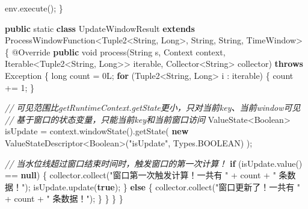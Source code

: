 \documentclass[cn,11pt,chinese]{elegantbook}
\newenvironment{Shaded}{}{}
\newcommand{\AttributeTok}[1]{\textcolor[rgb]{0.49,0.56,0.16}{#1}}
\newcommand{\BuiltInTok}[1]{#1}
\newcommand{\CommentTok}[1]{\textcolor[rgb]{0.38,0.63,0.69}{\textit{#1}}}
\newcommand{\DataTypeTok}[1]{\textcolor[rgb]{0.56,0.13,0.00}{#1}}
\newcommand{\DecValTok}[1]{\textcolor[rgb]{0.25,0.63,0.44}{#1}}
\newcommand{\FunctionTok}[1]{\textcolor[rgb]{0.02,0.16,0.49}{#1}}
\newcommand{\KeywordTok}[1]{\textcolor[rgb]{0.00,0.44,0.13}{\textbf{#1}}}
\newcommand{\NormalTok}[1]{#1}
\newcommand{\StringTok}[1]{\textcolor[rgb]{0.25,0.44,0.63}{#1}}
\begin{document}
\begin{Shaded}
\begin{Highlighting}[]
\NormalTok{        env.}\FunctionTok{execute}\NormalTok{();}
\NormalTok{    \}}

    \KeywordTok{public} \DataTypeTok{static} \KeywordTok{class}\NormalTok{ UpdateWindowResult }\KeywordTok{extends}\NormalTok{ ProcessWindowFunction\textless{}Tuple2\textless{}}\BuiltInTok{String}\NormalTok{, }\BuiltInTok{Long}\NormalTok{\textgreater{}, }\BuiltInTok{String}\NormalTok{, }\BuiltInTok{String}\NormalTok{, TimeWindow\textgreater{} \{}
        \AttributeTok{@Override}
        \KeywordTok{public} \DataTypeTok{void} \FunctionTok{process}\NormalTok{(}\BuiltInTok{String}\NormalTok{ s, }\BuiltInTok{Context}\NormalTok{ context, }\BuiltInTok{Iterable}\NormalTok{\textless{}Tuple2\textless{}}\BuiltInTok{String}\NormalTok{, }\BuiltInTok{Long}\NormalTok{\textgreater{}\textgreater{} iterable, Collector\textless{}}\BuiltInTok{String}\NormalTok{\textgreater{} collector) }\KeywordTok{throws} \BuiltInTok{Exception}\NormalTok{ \{}
            \DataTypeTok{long}\NormalTok{ count = }\DecValTok{0L}\NormalTok{;}
            \KeywordTok{for}\NormalTok{ (Tuple2\textless{}}\BuiltInTok{String}\NormalTok{, }\BuiltInTok{Long}\NormalTok{\textgreater{} i : iterable) \{}
\NormalTok{                count += }\DecValTok{1}\NormalTok{;}
\NormalTok{            \}}

            \CommentTok{// 可见范围比getRuntimeContext.getState更小，只对当前key、当前window可见}
            \CommentTok{// 基于窗口的状态变量，只能当前key和当前窗口访问}
\NormalTok{            ValueState\textless{}}\BuiltInTok{Boolean}\NormalTok{\textgreater{} isUpdate = context.}\FunctionTok{windowState}\NormalTok{().}\FunctionTok{getState}\NormalTok{(}
                    \KeywordTok{new}\NormalTok{ ValueStateDescriptor\textless{}}\BuiltInTok{Boolean}\NormalTok{\textgreater{}(}\StringTok{"isUpdate"}\NormalTok{, }\BuiltInTok{Types}\NormalTok{.}\FunctionTok{BOOLEAN}\NormalTok{)}
\NormalTok{            );}

            \CommentTok{// 当水位线超过窗口结束时间时，触发窗口的第一次计算！}
            \KeywordTok{if}\NormalTok{ (isUpdate.}\FunctionTok{value}\NormalTok{() == }\KeywordTok{null}\NormalTok{) \{}
\NormalTok{                collector.}\FunctionTok{collect}\NormalTok{(}\StringTok{"窗口第一次触发计算！一共有 "}\NormalTok{ + count + }\StringTok{" 条数据！"}\NormalTok{);}
\NormalTok{                isUpdate.}\FunctionTok{update}\NormalTok{(}\KeywordTok{true}\NormalTok{);}
\NormalTok{            \} }\KeywordTok{else}\NormalTok{ \{}
\NormalTok{                collector.}\FunctionTok{collect}\NormalTok{(}\StringTok{"窗口更新了！一共有 "}\NormalTok{ + count + }\StringTok{" 条数据！"}\NormalTok{);}
\NormalTok{            \}}
\NormalTok{        \}}
\NormalTok{    \}}
\NormalTok{\}}
\end{Highlighting}
\end{Shaded}
\end{document}
